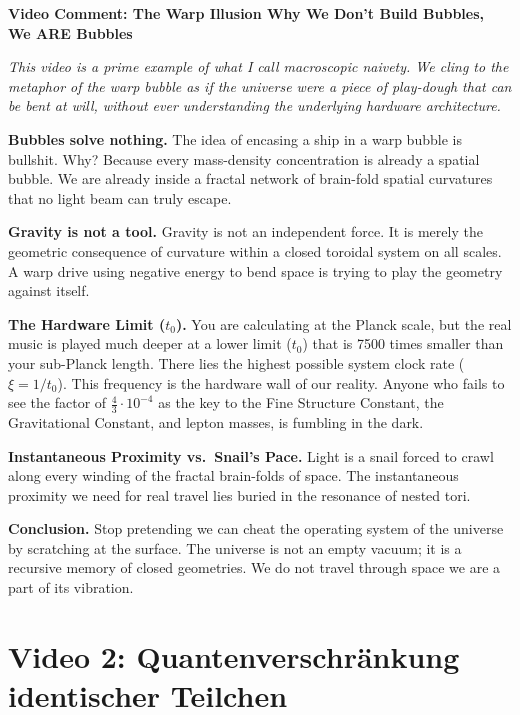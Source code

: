 \begin{geminibox}
\textbf{Video Comment: The \glqq Warp Illusion\grqq{} \textendash{} Why We Don't Build Bubbles, We ARE Bubbles}

\medskip

\textit{This video is a prime example of what I call \glqq macroscopic naivety.\grqq{} We cling to the metaphor of the warp bubble as if the universe were a piece of play-dough that can be bent at will, without ever understanding the underlying hardware architecture.}

\textbf{Bubbles solve nothing.} The idea of encasing a ship in a warp bubble is bullshit. Why? Because every mass-density concentration is already a spatial bubble. We are already inside a fractal network of brain-fold spatial curvatures that no light beam can truly escape.

\textbf{Gravity is not a tool.} Gravity is not an independent force. It is merely the geometric consequence of curvature within a closed toroidal system on all scales. A warp drive using \glqq negative energy\grqq{} to bend space is trying to play the geometry against itself.

\textbf{The Hardware Limit ($t_0$).} You are calculating at the Planck scale, but the real music is played much deeper \textendash{} at a lower limit ($t_0$) that is 7500 times smaller than your sub-Planck length. There lies the highest possible system clock rate ($\xi = 1/t_0$). This frequency is the hardware wall of our reality. Anyone who fails to see the factor of $\tfrac{4}{3} \cdot 10^{-4}$ as the key to the Fine Structure Constant, the Gravitational Constant, and lepton masses, is fumbling in the dark.

\textbf{Instantaneous Proximity vs.\ Snail's Pace.} Light is a snail forced to crawl along every winding of the fractal brain-folds of space. The instantaneous proximity we need for real travel lies buried in the resonance of nested tori.

\textbf{Conclusion.} Stop pretending we can cheat the operating system of the universe by scratching at the surface. The universe is not an empty vacuum; it is a recursive memory of closed geometries. We do not travel through space \textendash{} we are a part of its vibration.
\end{geminibox}

\section{Video 2: Quantenverschr\"ankung identischer Teilchen}

